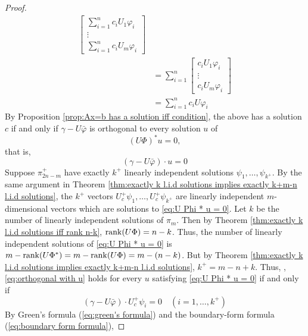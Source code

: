 \documentclass[11pt, oneside, a4paper]{article}
\begin{document}
\begin{proof}
{\begin{align*}
\begin{bmatrix}
            \sum_{i=1}^n c_i U_1\varphi_i\\
            \vdots\\
            \sum_{i=1}^n c_i U_m\varphi_i
        \end{bmatrix}\\
        &= \sum_{i=1}^n\begin{bmatrix}
            c_i U_1\varphi_i\\
            \vdots\\
            c_i U_m\varphi_i
        \end{bmatrix}\\
        &= \sum_{i=1}^n c_i U\varphi_i
    \end{align*}
    }
    By Proposition \ref{prop:Ax=b has a solution iff condition}, the above has a solution $c$ if and only if $\gamma-U\bar{\varphi}$ is orthogonal to every solution $u$ of
    \begin{equation}\label{eq:U Phi * u = 0}
    (U\Phi)^* u=0,
    \end{equation}
    that is,
    \begin{equation}\label{eq:orthogonal with u}
        (\gamma-U\bar{\varphi})\cdot u = 0
    \end{equation}
    Suppose $\pi^+_{2n-m}$ have exactly $k^+$ linearly independent solutions $\psi_1,\ldots,\psi_{k^+}$. By the same argument in Theorem \ref{thm:exactly k l.i.d solutions implies exactly k+m-n l.i.d solutions}, the $k^+$ vectors $U_c^+\psi_1,\ldots, U_c^+\psi_{k^+}$ are linearly independent $m$-dimensional vectors which are solutions to \ref{eq:U Phi * u = 0}. Let $k$ be the number of linearly independent solutions of $\pi_m$. Then by Theorem \ref{thm:exactly k l.i.d solutions iff rank n-k}, $\operatorname{rank}(U\Phi)=n-k$. Thus, the number of linearly independent solutions of \ref{eq:U Phi * u = 0} is $m-\operatorname{rank}(U\Phi^*) = m-\operatorname{rank}(U\Phi) = m - (n-k)$. But by Theorem \ref{thm:exactly k l.i.d solutions implies exactly k+m-n l.i.d solutions}, $k^+ = m-n+k$. Thus, , \ref{eq:orthogonal with u} holds for every $u$ satisfying \ref{eq:U Phi * u = 0} if and only if
    \begin{equation}\label{eq:orthogonal with U_c^+varphi_i}
        (\gamma-U\bar{\varphi})\cdot U_c^+\psi_i=0\quad(i=1,\ldots,k^+)
    \end{equation}
    By Green's formula (\ref{eq:green's formula}) and the boundary-form formula (\ref{eq:boundary form formula}),
    \LIN{
    \begin{equation}

\end{equation}}
\end{proof}
\end{document}
